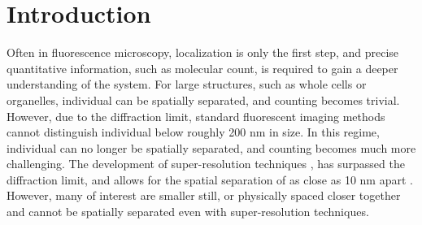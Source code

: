 \section{Introduction}

Often in fluorescence microscopy, localization is only the first step, and precise quantitative information, 
  such as molecular count, is required to gain a deeper understanding of the system.
  For large structures, such as whole cells or organelles, individual \objects can be spatially separated, 
  and counting becomes trivial.
  However, due to the diffraction limit, standard fluorescent imaging methods cannot distinguish individual \objects 
  below roughly 200 nm in size. 
  In this regime, individual \objects can no longer be spatially separated, and counting becomes much more challenging. 
  The development of super-resolution techniques \cite{betzig_2006, rust_2006}, has surpassed the diffraction limit, and allows
  for the spatial separation of \objects as close as 10 nm apart \cite{valli_seeing_2021}.
  However, many \objects of interest are smaller still, or physically spaced closer 
  together and cannot be spatially separated even with super-resolution techniques.


